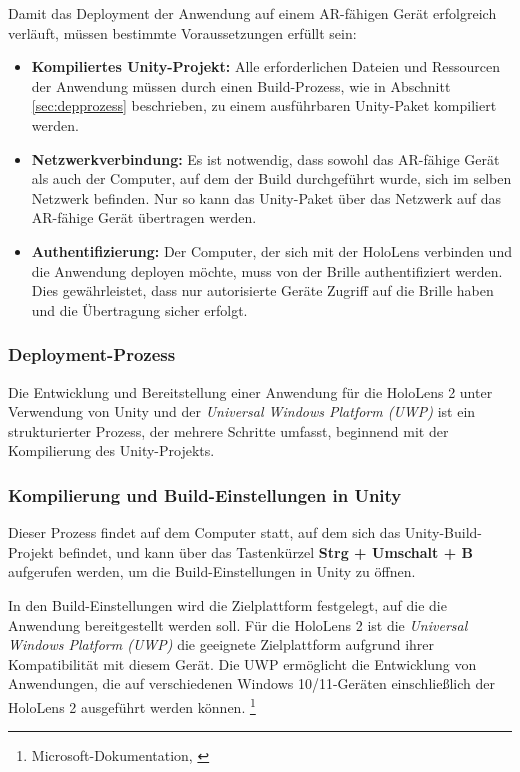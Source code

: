 Damit das Deployment der Anwendung auf einem AR-fähigen Gerät erfolgreich verläuft, müssen bestimmte Voraussetzungen erfüllt sein:

\begin{itemize}
    \item \textbf{Kompiliertes Unity-Projekt:} Alle erforderlichen Dateien und Ressourcen der Anwendung müssen durch einen Build-Prozess, wie in Abschnitt \ref{sec:depprozess} beschrieben, zu einem ausführbaren Unity-Paket kompiliert werden.

    \item \textbf{Netzwerkverbindung:} Es ist notwendig, dass sowohl das AR-fähige Gerät als auch der Computer, auf dem der Build durchgeführt wurde, sich im selben Netzwerk befinden. Nur so kann das Unity-Paket über das Netzwerk auf das AR-fähige Gerät übertragen werden.

    \item \textbf{Authentifizierung:} Der Computer, der sich mit der HoloLens verbinden und die Anwendung deployen möchte, muss von der Brille authentifiziert werden. Dies gewährleistet, dass nur autorisierte Geräte Zugriff auf die Brille haben und die Übertragung sicher erfolgt.
\end{itemize}

\subsubsection{\label{sec:depprozess}Deployment-Prozess}

Die Entwicklung und Bereitstellung einer Anwendung für die HoloLens 2 unter Verwendung von Unity und der \textit{Universal Windows Platform (UWP)} ist ein strukturierter Prozess, der mehrere Schritte umfasst, beginnend mit der Kompilierung des Unity-Projekts.

\subsubsection*{Kompilierung und Build-Einstellungen in Unity}
Dieser Prozess findet auf dem Computer statt, auf dem sich das Unity-Build-Projekt befindet, und kann über das Tastenkürzel \textbf{Strg + Umschalt + B} aufgerufen werden, um die Build-Einstellungen in Unity zu öffnen.

In den Build-Einstellungen wird die Zielplattform festgelegt, auf die die Anwendung bereitgestellt werden soll. Für die
HoloLens 2 ist die \textit{Universal Windows Platform (UWP)} die geeignete Zielplattform aufgrund ihrer Kompatibilität mit
diesem Gerät. Die UWP ermöglicht die Entwicklung von Anwendungen, die auf verschiedenen Windows 10/11-Geräten einschließlich
der HoloLens 2 ausgeführt werden können. \footnote{Microsoft-Dokumentation, \cite{Universal Windows Platform}}

